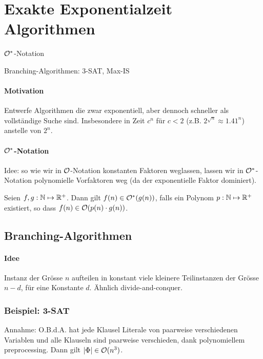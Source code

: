 \section{Exakte Exponentialzeit Algorithmen}

\begin{takeaway}
    \item $\mathcal{O}^*$-Notation
    \item Branching-Algorithmen: 3-SAT, Max-IS
\end{takeaway}

\paragraph{Motivation}
Entwerfe Algorithmen die zwar exponentiell, aber dennoch schneller als vollständige Suche sind.
Insbesondere in Zeit $c^n$ für $c < 2$ (z.B. $2^{\sqrt{n}} \approx 1.41^n$) anstelle von $2^n$.

\paragraph{$\mathcal{O}^*$-Notation}
Idee: so wie wir in $\mathcal{O}$-Notation konstanten Faktoren weglassen, lassen wir in $\mathcal{O}^*$-Notation
polynomielle Vorfaktoren weg (da der exponentielle Faktor dominiert).

Seien $f,g : \mathbb{N} \mapsto \mathbb{R}^+$. Dann gilt $f(n) \in \mathcal{O}^*(g(n))$, falls ein Polynom $p : \mathbb{N} \mapsto \mathbb{R}^+$
existiert, so dass $f(n) \in \mathcal{O}(p(n) \cdot g(n))$.


\subsection{Branching-Algorithmen}

\paragraph{Idee}
Instanz der Grösse $n$ aufteilen in konstant viele kleinere Teilinstanzen der Grösse $n-d$, für eine Konstante $d$.
Ähnlich divide-and-conquer.


\subsubsection{Beispiel: 3-SAT}

Annahme: O.B.d.A. hat jede Klausel Literale von paarweise verschiedenen Variablen und alle Klauseln sind
paarweise verschieden, dank polynomiellem preprocessing.
Dann gilt $|\Phi| \in \mathcal{O}(n^3)$.


